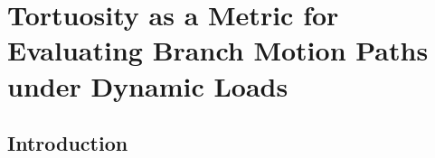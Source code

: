 \chapter{Tortuosity as a Metric for Evaluating Branch Motion Paths under Dynamic Loads}
\label{chap:tortuosity}

\section{Introduction} 
